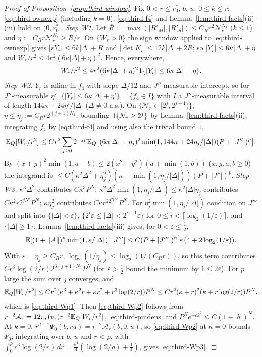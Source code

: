 \begin{proof}[Proof of Proposition~\ref{prop:third-window}]
Fix $0<r\le r_0^*$, $b$, $u$, $0\le k\le r$; \eqref{eq:third-ownexp} (including $k=0$), \eqref{eq:third-f4} and Lemma~\ref{lem:third-facts}(ii)--(iii) hold on $(0,r_0^*]$.
\emph{Step W1.} Let $\bar R:=\max(|R'_M|,|R'_S|)\le C_Rr^2\mathcal N_r^{N_1}$ ($k\le1$) and $\eta:=C_Rr\mathcal N_r^{N_1}\ge\bar R/r$. On $\{W_r>0\}$ the sign window applied to \eqref{eq:third-ownexp} gives $|rY_r|\le6k|\Delta|+\bar R$ and $|\det K_i|\le12k|\Delta|+2\bar R$; so $|Y_r|\le6\kappa|\Delta|+\eta$ and $W_r/r^2\le4r^2(6\kappa|\Delta|+\eta)^2$. Hence, everywhere,
\begin{equation}\label{eq:third-W41}
W_r/r^2\le4r^2(6\kappa|\Delta|+\eta)^2\mathbf 1\{|Y_r|\le6\kappa|\Delta|+\eta\}.
\end{equation}
\emph{Step W2.} $Y_r$ is affine in $f_4$ with slope $\Delta/12$ and $J''$-measurable intercept, so for $J''$-measurable $\eta'$, $\{|Y_r|\le6\kappa|\Delta|+\eta'\}=\{f_4\in I\}$ with $I$ a $J''$-measurable interval of length $144\kappa+24\eta'/|\Delta|$ ($\Delta\ne0$ a.s.). On $\{\mathcal N_r\in[2^j,2^{j+1})\}$, $\eta\le\eta_j:=C_Rr2^{(j+1)N_1}$; bounding $\mathbf 1\{\mathcal N_r\ge2^j\}$ by Lemma~\ref{lem:third-facts}(ii), integrating $f_4$ by \eqref{eq:third-f4} and using also the trivial bound $1$,
\[
\mathbb E_Q[W_r/r^2]\le Cr^2\sum_{j\ge0}2^{-jp}\mathbb E_Q\bigl[(6\kappa|\Delta|+\eta_j)^2\min(1,144\kappa+24\eta_j/|\Delta|)(P+|J''|)^p\bigr].
\]
By $(x+y)^2\min(1,a+b)\le2(x^2+y^2)(a+\min(1,b))$ ($x,y,a,b\ge0$) the integrand is $\le C(\kappa^2\Delta^2+\eta_j^2)(\kappa+\min(1,\eta_j/|\Delta|))(P+|J''|)^p$.
\emph{Step W3.} $\kappa^3\Delta^2$ contributes $C\kappa^3P^N$; $\kappa^2\Delta^2\min(1,\eta_j/|\Delta|)\le\kappa^2|\Delta|\eta_j$ contributes $C\kappa^2r2^{jN'}P^N$; $\kappa\eta_j^2$ contributes $C\kappa r^22^{2jN'}P^N$. For $\eta_j^2\min(1,\eta_j/|\Delta|)$ condition on $J'''$ and split into $\{|\Delta|<\varepsilon\}$, $\{2^i\varepsilon\le|\Delta|<2^{i+1}\varepsilon\}$ for $0\le i<\lceil\log_2(1/\varepsilon)\rceil$, and $\{|\Delta|\ge1\}$; Lemma~\ref{lem:third-facts}(iii) gives, for $0<\varepsilon\le\frac12$,
\begin{equation}\label{eq:third-W42}
\mathbb E[(1+\|A\|)^n\min(1,\varepsilon/|\Delta|)\mid J''']\le C(P+|J'''|)^{n'}\varepsilon\,(4+2\log_2(1/\varepsilon)).
\end{equation}
With $\varepsilon=\eta_j\ge C_Rr$, $\log_2(1/\eta_j)\le\log_2(1/(C_Rr))$, so this term contributes $Cr^3\log(2/r)2^{3(j+1)N_1}P^N$ (for $\varepsilon>\frac12$ bound the minimum by $1\le2\varepsilon$). For $p$ large the sum over $j$ converges, and
\[
\mathbb E_Q[W_r/r^2]\le Cr^2(\kappa^3+\kappa^2r+\kappa r^2+r^3\log(2/r))P^N\le Cr^2(\kappa+r)^2(\kappa+r\log(2/r))P^N,
\]
which is \eqref{eq:third-Wp1}. Then \eqref{eq:third-Wp2} follows from $r^{-2}\mathcal A_r=12\pi_r(v_r)r^{-2}\mathbb E_Q[W_r/r^2]$, \eqref{eq:third-pindens} and $P^Ne^{-ck^2}\le C(1+|b|)^N$. At $k=0$, $r^{d-1}\Psi_0(b,ru)=r^{-2}\mathcal A_r(b,0,u)$, so \eqref{eq:third-Wp2} at $\kappa=0$ bounds $\Psi_0$; integrating over $b$, $u$ and $r<\rho$, with $\int_0^\rho r^3\log(2/r)\,dr=\frac{\rho^4}4(\log(2/\rho)+\frac14)$, gives \eqref{eq:third-Wp3}.
\end{proof}

